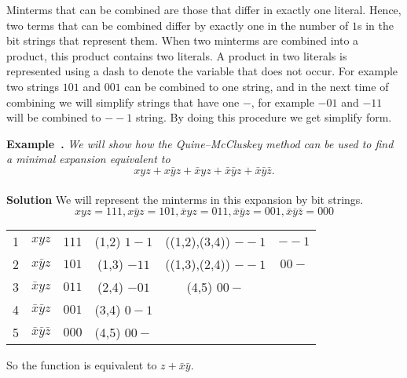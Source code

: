 \documentclass{article}
\newcounter{example}
\newenvironment{example}[1][]{\refstepcounter{example}\par\medskip
\noindent\textbf{Example~\theexample. #1} \rmfamily}{\medskip}
\begin{document}
 Minterms that can be combined are those that differ in exactly one literal.  Hence, two terms  that can be combined differ by exactly one in the number of $1$s  in the bit strings that represent them.
     When two minterms are combined into a product, this product contains two literals. A product in two literals is represented using a dash to denote the variable that does not occur. For example two strings $101$ and $001$ can be combined to one string, and in the next time of combining we will simplify strings that have one $-$, for example $-01$ and $-11$ will be combined to $--1$ string. By doing this procedure we get simplify form.
\begin{example}
    \textit{We will show how the Quine–McCluskey method can be used to find a minimal expansion equivalent to }
    $$xyz + x \bar y z + \bar x yz + \bar x \bar y z + \bar x \bar y \bar z. $$
    \\ \textbf{Solution}  We will represent the minterms in this expansion by bit strings.
    $$xyz=111, x \bar y z =101 , \bar x yz =011 , \bar x \bar y z=001, \bar x \bar y \bar z=000  $$
    \begin{center}
\begin{tabular}{c|c|c|c|c|c} \hline
\rowcolor{yellow}\multicolumn{6}{c}{Quine–McCluskey method } \\ \hline
1 &$xyz$&    \cellcolor{red!50}111& \cellcolor{orange!50}(1,2) $1-1$  & \cellcolor{yellow!50}((1,2),(3,4)) $--1$ & \cellcolor{yellow!50}$--1$\\ \hline
2& $x \bar y z$ &     \cellcolor{orange!50}$101$   &     \cellcolor{orange!50}(1,3) $-11$     & \cellcolor{yellow!50}((1,3),(2,4)) $--1$ & \cellcolor{yellow!10}$00-$   \\ \hline
3& $\bar x y z$ &     \cellcolor{orange!50}$011$    &      \cellcolor{yellow!50}(2,4) $-01$     &  \cellcolor{yellow!10}(4,5) $00-$ &   \\ \hline
4&$\bar x \bar y z$ &     \cellcolor{yellow!50}$001$    &      \cellcolor{yellow!50}(3,4) $0-1$      &  &    \\ \hline
5&$\bar x \bar y \bar z$ &   \cellcolor{yellow!10} $000$    &     \cellcolor{yellow!10}(4,5) $00-$   &  &    \\ \hline
\end{tabular} 
\end{center}
 So the function is equivalent to  $z+ \bar x \bar y $.
\end{example}
\end{document}
